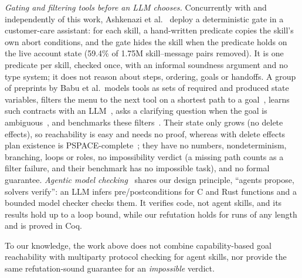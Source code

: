 \documentclass{article}
\theoremstyle{plain}
\theoremstyle{definition}
\newcommand{\bnew}{\begingroup\color{revblue}}
\newcommand{\bnew}{\begingroup}
\newcommand{\enew}{\endgroup}
\begin{document}
\bnew \emph{Gating and filtering tools before an LLM chooses.} Concurrently
with and independently of this work, Ashkenazi et al.~\cite{wixgate} deploy
a deterministic gate in a customer-care assistant: for each skill, a
hand-written predicate copies the skill's own abort conditions, and the gate
hides the skill when the predicate holds on the live account state (59.4\% of
1.75M skill--message pairs removed). It is one predicate per skill, checked
once, with an informal soundness argument and no type system; it does not
reason about steps, ordering, goals or handoffs. A group of preprints by Babu
et al.\ models tools as sets of required and produced state variables, filters
the menu to the next tool on a shortest path to a goal~\cite{cmtf}, learns
such contracts with an LLM~\cite{contract2tool}, asks a clarifying question
when the goal is ambiguous~\cite{gistcmtf}, and benchmarks these
filters~\cite{toolmenubench}. Their state only grows (no delete effects), so
reachability is easy and needs no proof, whereas with delete effects plan
existence is PSPACE-complete~\cite{bylander}; they have no numbers,
nondeterminism, branching, loops or roles, no impossibility verdict (a
missing path counts as a filter failure, and their benchmark has no
impossible task), and no formal guarantee. \emph{Agentic model
checking}~\cite{amc} shares our design principle, ``agents propose, solvers
verify'': an LLM infers pre/postconditions for C and Rust functions and a
bounded model checker checks them. It verifies code, not agent skills, and
its results hold up to a loop bound, while our refutation holds for runs of
any length and is proved in Coq.\enew

To our knowledge, the work above does not combine capability-based goal
reachability with multiparty protocol checking for agent skills, nor provide
the same refutation-sound guarantee for an \emph{impossible} verdict.
\end{document}
